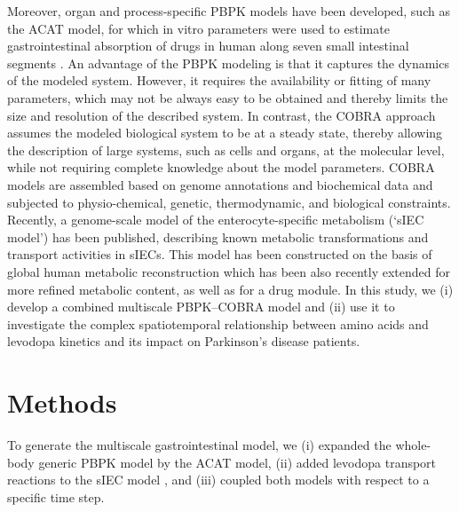 Moreover, organ and process-specific PBPK models have been developed, such as the ACAT model, for which in vitro parameters were used to estimate gastrointestinal absorption of drugs in human along seven small intestinal segments \cite{agoram2001predicting}. An advantage of the PBPK modeling is that it captures the dynamics of the modeled system. However, it requires the availability or fitting of many parameters, which may not be always easy to be obtained and thereby limits the size and resolution of the described system. In contrast, the COBRA approach assumes the modeled biological system to be at a steady state, thereby allowing the description of large systems, such as cells and organs, at the molecular level, while not requiring complete knowledge about the model parameters\cite{o2015using}. COBRA models are assembled based on genome annotations and biochemical data \cite{thiele2010protocol} and subjected to physio-chemical, genetic, thermodynamic, and biological constraints\cite{beard2002energy}. Recently, a genome-scale model of the enterocyte-specific metabolism (‘sIEC model’) has been published, describing known metabolic transformations and transport activities in sIECs\cite{sahoo2013predicting}. This model has been constructed on the basis of global human metabolic reconstruction \cite{duarte2007global} which has been also recently extended for more refined metabolic content\cite{thiele2013community}\cite{sahoo2014membrane}, as well as for a drug module\cite{sahoo2015modeling}. In this study, we (i) develop a combined multiscale PBPK–COBRA model and (ii) use it to investigate the complex spatiotemporal relationship between amino acids and levodopa kinetics and its impact on Parkinson's disease patients.

\section{Methods}
To generate the multiscale gastrointestinal model, we (i) expanded the
whole-body generic PBPK model\cite{peters2008evaluation} by the ACAT model\cite{agoram2001predicting}, (ii) added levodopa transport reactions to the sIEC model \cite{camargo2014molecular}, and (iii) coupled both models with respect to a specific time step.
